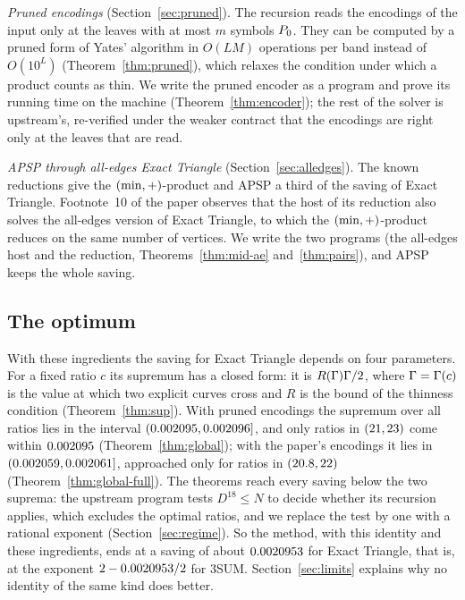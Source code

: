 \emph{Pruned encodings} (Section~\ref{sec:pruned}).  The recursion reads the
encodings of the input only at the leaves with at most \(m\) symbols \(P_{0}\).
They can be computed by a pruned form of Yates' algorithm in \(O(LM)\)
operations per band instead of \(O(10^{L})\) (Theorem~\ref{thm:pruned}), which
relaxes the condition under which a product counts as thin.  We write the
pruned encoder as a program and prove its running time on the machine
(Theorem~\ref{thm:encoder}); the rest of the solver is upstream's, re-verified
under the weaker contract that the encodings are right only at the leaves that
are read.

\emph{APSP through all-edges Exact Triangle} (Section~\ref{sec:alledges}).
The known reductions give the \((\min,+)\)-product and APSP a third of the
saving of Exact Triangle.  Footnote~10 of the paper observes that the host of
its reduction also solves the all-edges version of Exact Triangle, to which the
\((\min,+)\)-product reduces on the same number of vertices.  We write the two
programs (the all-edges host and the reduction, Theorems~\ref{thm:mid-ae}
and~\ref{thm:pairs}), and APSP keeps the whole saving.

\subsection*{The optimum}

With these ingredients the saving for Exact Triangle depends on four
parameters.  For a fixed ratio \(c\) its supremum has a closed form: it is
\(R(\Gamma)\Gamma/2\), where \(\Gamma=\Gamma(c)\) is the value at which two explicit
curves cross and \(R\) is the bound of the thinness condition
(Theorem~\ref{thm:sup}).  With pruned encodings the supremum over all ratios
lies in the interval \((0.002095,0.002096]\), and only ratios in
\((21,23)\) come within \(0.002095\)
(Theorem~\ref{thm:global}); with the paper's encodings it lies in
\((0.002059,0.002061]\), approached only for ratios in \((20.8,22)\)
(Theorem~\ref{thm:global-full}).  The theorems reach every saving below the
two suprema: the upstream program tests \(D^{18}\le N\) to decide whether its
recursion applies, which excludes the optimal ratios, and we replace the test
by one with a rational exponent (Section~\ref{sec:regime}).
So the method, with this identity and these ingredients, ends at a saving of
about \(0.0020953\) for Exact Triangle, that is, at the exponent
\(2-0.0020953/2\) for 3SUM.  Section~\ref{sec:limits} explains why no identity
of the same kind does better.

